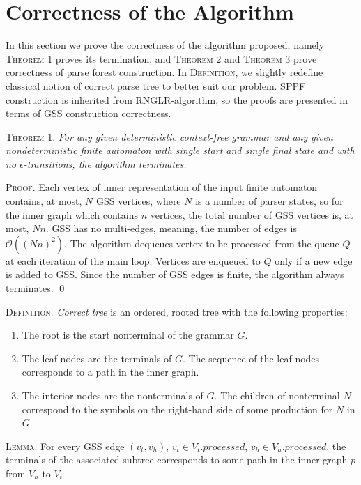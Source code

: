 \section{Correctness of the Algorithm}
In this section we prove the correctness of the algorithm proposed, namely \textsc{Theorem 1} proves its termination,
and \textsc{Theorem 2} and \textsc{Theorem 3} prove correctness of parse forest construction.
In \textsc{Definition}, we slightly redefine classical notion of correct parse tree to better suit our problem. 
SPPF construction is inherited from RNGLR-algorithm, so the proofs are presented
in terms of GSS construction correctness. 

\textsc{Theorem 1.}
\textit{For any given deterministic context-free grammar and any given nondeterministic
finite automaton with single start and single final state and with no $\epsilon$-transitions,
the algorithm terminates.}

\textsc{Proof.}
Each vertex of inner representation of the input finite automaton contains, at most, 
$N$ GSS vertices, where $N$ is a number of parser states, so for the inner graph which contains $n$
vertices, the total number of GSS vertices is, at most, $Nn$. GSS has no multi-edges,  
meaning, the number of edges is $\mathcal{O}((Nn)^2)$. 
The algorithm dequeues vertex to be processed from the queue $Q$ at each iteration of the 
main loop. Vertices are enqueued to $Q$ only if a new edge is added to GSS. Since the number of 
GSS edges is finite, the algorithm always terminates. \qed

\textsc{Definition.} 
\emph{Correct tree} is an ordered, rooted tree with the following properties:
\begin{enumerate}
  \item The root is the start nonterminal of the grammar $G$.
  \item The leaf nodes are the terminals of $G$. The sequence of the leaf nodes 
        corresponds to a path in the inner graph. 
  \item The interior nodes are the nonterminals of $G$. The children of nonterminal 
        $N$ correspond to the symbols on the right-hand side of some production for $N$ in $G$.
\end{enumerate}

\textsc{Lemma.}
For every GSS edge $(v_{t}, v_{h})$, $v_{t} \in V_{t}.processed$, $v_{h} \in V_{h}.processed$, 
the terminals of the associated subtree corresponds to some path in the inner graph $p$ from $V_{h}$ to $V_{t}$

